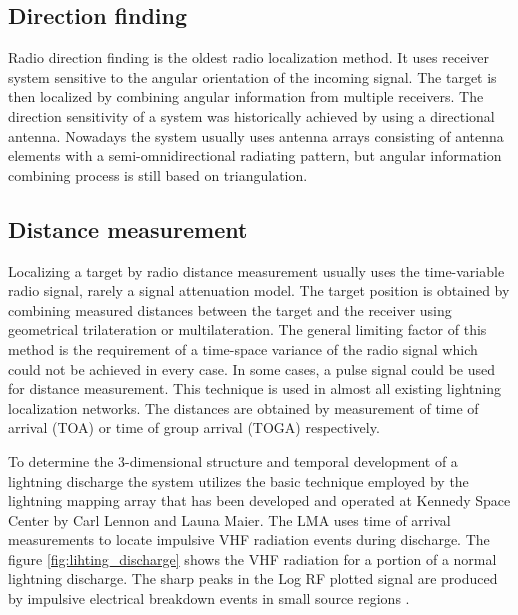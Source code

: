 \documentclass[twoside]{ctuthesis}
\theoremstyle{plain}
\theoremstyle{definition}
\theoremstyle{note}
\begin{document}
\subsection{Direction finding}

Radio direction finding is the oldest radio localization method.  It uses receiver system sensitive to the angular orientation of the incoming signal.  The target is then localized by combining angular information from multiple receivers.  The direction sensitivity of a system was historically achieved by using a directional antenna. Nowadays the system usually uses antenna arrays consisting of antenna elements with a semi-omnidirectional radiating pattern, but angular information combining process is still based on triangulation. 

\subsection{Distance measurement}
Localizing a target by radio distance measurement usually uses the time-variable radio signal, rarely a signal attenuation model.  The target position is obtained by combining measured distances between the target and the receiver using geometrical trilateration or multilateration. The general limiting factor of this method is the requirement of a time-space variance of the radio signal which could not be achieved in every case. 
In some cases, a pulse signal could be used for distance measurement. This technique is used in almost all existing lightning localization networks. The distances are obtained by measurement of time of arrival (TOA) or time of group arrival (TOGA) respectively.

To determine the 3-dimensional structure and temporal development of a lightning discharge the system utilizes the basic technique employed by the lightning mapping array that has been developed and operated at Kennedy Space Center by Carl Lennon and Launa Maier. The LMA uses time of arrival measurements to locate impulsive VHF radiation events during discharge. The figure \ref{fig:lihting_discharge} shows the VHF radiation for a portion of a normal lightning discharge. The sharp peaks in the Log RF plotted signal are produced by impulsive electrical breakdown events in small source regions \cite{NMLMA}. 
\end{document}
